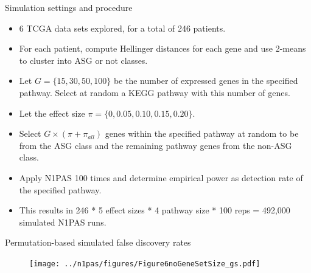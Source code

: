 \documentclass[ignorenonframetext,aspectratio=169,]{beamer}
\begin{document}
\begin{frame}{%
\protect\hypertarget{simulation-settings-and-procedure}{%
Simulation settings and procedure}}

\begin{itemize}
  \item 6 TCGA data sets explored, for a total of 246 patients.
    \item For each patient, compute Hellinger distances for each gene and use 2-means to cluster into ASG or not classes.
    \item Let $G=\{15, 30, 50, 100\}$ be the number of expressed genes in the specified pathway. Select at random a KEGG pathway with this number of genes.
    \item Let the effect size $\pi=\{0, 0.05, 0.10, 0.15, 0.20\}$.
    \item Select $G \times (\pi + \pi_{all})$ genes within the specified pathway at random to be from the ASG class and the remaining pathway genes from the non-ASG class.
    \item Apply N1PAS 100 times and determine empirical power as detection rate of the specified pathway.
      \item This results in 246 * 5 effect sizes * 4 pathway size * 100 reps = 492,000 simulated N1PAS runs.
\end{itemize}

\end{frame}

\begin{frame}{%
\protect\hypertarget{permutation-based-simulated-false-discovery-rates}{%
Permutation-based simulated false discovery rates}}

\begin{figure}[htb]
  \centering \texttt{[image: ../n1pas/figures/Figure6noGeneSetSize\_gs.pdf]}
\end{figure}

\end{frame}
\end{document}
